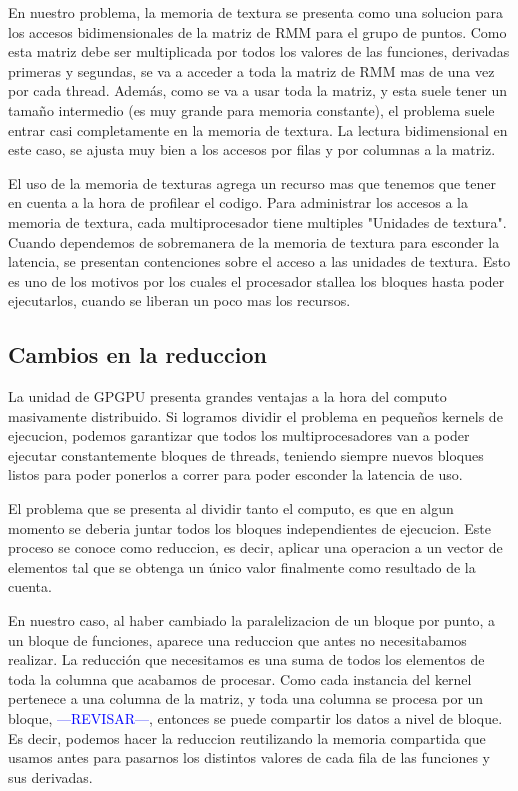 En nuestro problema, la memoria de textura se presenta como una solucion para
los accesos bidimensionales de la matriz de RMM para el grupo de puntos. 
Como esta matriz debe ser multiplicada por todos los valores de las funciones,
derivadas primeras y segundas, se va a acceder a toda la matriz de RMM mas de
una vez por cada thread. Adem\'as, como se va a usar toda la matriz, y esta suele
tener un tamaño intermedio (es muy grande para memoria constante), el problema
suele entrar casi completamente en la memoria de textura.
La lectura bidimensional en este caso, se ajusta muy bien a los accesos por filas
y por columnas a la matriz.

El uso de la memoria de texturas agrega un recurso mas que tenemos que tener en
cuenta a la hora de profilear el codigo. Para administrar los accesos a 
la memoria de textura, cada multiprocesador tiene multiples "Unidades de textura".
Cuando dependemos de sobremanera de la memoria de textura para esconder la latencia,
se presentan contenciones sobre el acceso a las unidades de textura. Esto es
uno de los motivos por los cuales el procesador stallea los bloques hasta poder
ejecutarlos, cuando se liberan un poco mas los recursos.

\subsection{Cambios en la reduccion}

La unidad de GPGPU presenta grandes ventajas a la hora del computo masivamente distribuido.
Si logramos dividir el problema en pequeños kernels de ejecucion, podemos garantizar que 
todos los multiprocesadores van a poder ejecutar constantemente bloques de threads, teniendo
siempre nuevos bloques listos para poder ponerlos a correr para poder esconder la latencia de uso.

El problema que se presenta al dividir tanto el computo, es que en algun momento se deberia juntar
todos los bloques independientes de ejecucion. Este proceso se conoce como reduccion, es decir,
aplicar una operacion a un vector de elementos tal que se obtenga un \'unico valor finalmente
como resultado de la cuenta. 

En nuestro caso, al haber cambiado la paralelizacion de un bloque por punto, a un bloque
de funciones, aparece una reduccion que antes no necesitabamos realizar. La reducci\'on que
necesitamos es una suma de todos los elementos de toda la columna que acabamos de procesar.
Como cada instancia del kernel pertenece a una columna de la matriz, y toda una columna se
procesa por un bloque, \textcolor{blue}{---REVISAR---}, entonces se puede compartir los datos
a nivel de bloque. Es decir, podemos hacer la reduccion reutilizando la memoria compartida
que usamos antes para pasarnos los distintos valores de cada fila de las funciones y sus derivadas.

